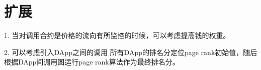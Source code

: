\section{扩展}
1. 当对调用合约是价格的流向有所监控的时候，可以考虑提高钱的权重。

2. 可以考虑引入DApp之间的调用
所有DApp的排名分定位page rank初始值，随后根据DApp间调用图运行page rank算法作为最终排名分。